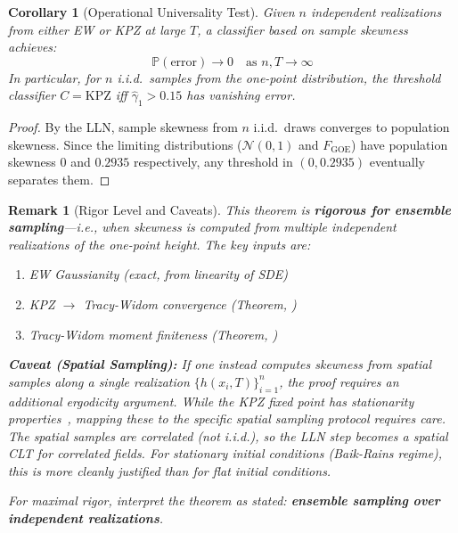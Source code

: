 \documentclass[aps,pre,reprint,amsmath,amssymb,superscriptaddress]{revtex4-2}
\newtheorem{remark}{Remark}
\newtheorem{corollary}{Corollary}
\newcommand{\KPZ}{\text{KPZ}}
\newcommand{\bbP}{\mathbb{P}}
\begin{document}
\begin{corollary}[Operational Universality Test]
\label{cor:classifier}
Given $n$ independent realizations from either EW or KPZ at large $T$, a classifier based on sample skewness achieves:
\begin{equation}
\bbP(\text{error}) \to 0 \quad \text{as } n, T \to \infty
\end{equation}
In particular, for $n$ i.i.d.\ samples from the one-point distribution, the threshold classifier $C = \KPZ$ iff $\hat{\gamma}_1 > 0.15$ has vanishing error.
\end{corollary}

\begin{proof}
By the LLN, sample skewness from $n$ i.i.d.\ draws converges to population skewness. Since the limiting distributions ($\mathcal{N}(0,1)$ and $F_{\text{GOE}}$) have population skewness $0$ and $0.2935$ respectively, any threshold in $(0, 0.2935)$ eventually separates them.
\end{proof}

\begin{remark}[Rigor Level and Caveats]
\label{rem:rigor-caveats}
This theorem is \textbf{rigorous for ensemble sampling}---i.e., when skewness is computed from multiple independent realizations of the one-point height. The key inputs are:
\begin{enumerate}
\item EW Gaussianity (exact, from linearity of SDE)
\item KPZ $\to$ Tracy-Widom convergence (Theorem, \cite{CorwinQuastel2013,SasamotoSpohn2010})
\item Tracy-Widom moment finiteness (Theorem, \cite{Baik2008})
\end{enumerate}

\textbf{Caveat (Spatial Sampling):} If one instead computes skewness from spatial samples along a single realization $\{h(x_i, T)\}_{i=1}^n$, the proof requires an additional ergodicity argument. While the KPZ fixed point has stationarity properties~\cite{MQR2021}, mapping these to the specific spatial sampling protocol requires care. The spatial samples are correlated (not i.i.d.), so the LLN step becomes a spatial CLT for correlated fields. For stationary initial conditions (Baik-Rains regime), this is more cleanly justified than for flat initial conditions.

For maximal rigor, interpret the theorem as stated: \textbf{ensemble sampling over independent realizations}.
\end{remark}
\end{document}
